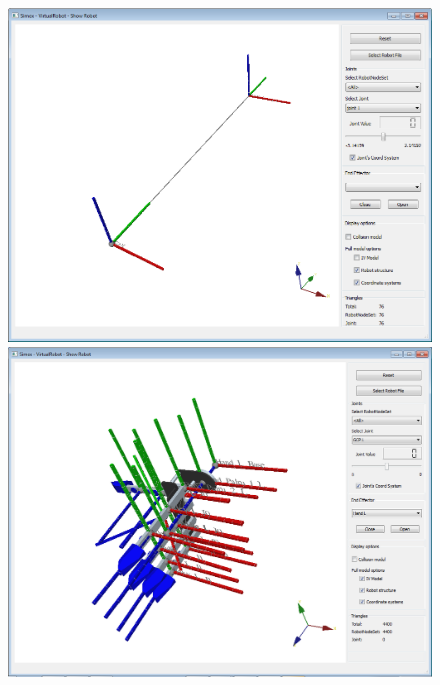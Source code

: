 \documentclass{book}
\begin{document}
\begin{figure}[H]
	\centering
	\begin{minipage} {.45\linewidth}
	  \includegraphics[width=\linewidth]{Tutorial3a}
	\end{minipage}
	\begin{minipage} {.45\linewidth}
	  \includegraphics[width=\linewidth]{Tutorial9b}
	\end{minipage}
\end{figure}
\end{document}
